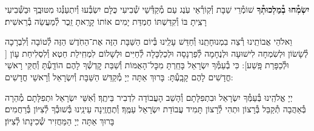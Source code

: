 \documentclass[twoside, openany, parskip=half, 11pt]{book}
\begin{document}
\begin{sometimes}
\textbf{יִשְׂמְ֯חוּ בְ֯מַלְכוּתְ֯ךָ}
שׁוֹמְ֯רֵי שַׁבָּת וְ֯קֽוֹרְ֯אֵי עֹֽנֶג עַם מְ֯קַדְּ֯שֵׁי שְׁ֯בִיעִי כֻּלָּם יִשְׂבְּ֯עוּ וְ֯יִתְעַנְּ֯גוּ מִטּוּבֶֽךָ וּבַשְּׁ֯בִיעִי רָצִֽיתָ בּוֹ וְ֯קִדַּשְׁתּוֹ חֶמְדַּת יָמִים אוֹתוֹ קָרָֽאתָ זֵֽכֶר לְ֯מַעֲשֵׂה בְ֯רֵאשִׁית׃

 וֵאלֹהֵי אֲבוֹתֵֽינוּ רְ֯צֵה בִמְנוּחָתֵֽנוּ וְ֯חַדֵּשׁ עָלֵֽינוּ בְּ֯יוֹם הַשַּׁבָּת הַזֶּה אֶת־הַחֹֽדֶשׁ הַזֶּה לְ֯טוֹבָה וְ֯לִבְרָכָה לְ֯שָׂשׂוֹן וּלְשִׂמְחָה לִישׁוּעָה וּלְנֶחָמָה לְ֯פַרְנָסָה וּלְכַלְכָּלָה לְ֯חַיִּים וּלְשָׁלוֹם לִמְחִֽילַת חֵטְא וְ֯לִסְלִיחַת עָוֹן [
וּלְ֯כַפָּרַת פָּֽשַׁע]: כִּי בְ֯עַמְּ֯ךָ יִשְׂרָאֵל בָּחַֽרְתָּ מִכׇּל־הָאֻמּוֹת וְ֯שַׁבַּת קׇדְשְׁ֯ךָ לָהֶם הוֹדָֽעְ֯תָּ וְ֯חֻקֵּי רָאשֵׁי חֳדָשִׁים לָהֶם קָבָֽעְ֯תָּ: בָּרוּךְ אַתָּה יְיָ מְ֯קַדֵּשׁ הַשַּׁבָּת וְ֯יִשְׂרָאֵל וְ֯רָאשֵׁי חֳדָשִׁים: 

\end{sometimes}

יְיָ אֱלֹהֵֽינוּ בְּ֯עַמְּ֯ךָ יִשְׂרָאֵל וּבִתְפִלָּתָם וְ֯הָשֵׁב הָעֲבוֹדָה לִדְבִיר בֵּיתֶֽךָ׃ וְ֯אִשֵּׁי יִשְׂרָאֵל וּתְפִלָּתָם מְ֯הֵרָה בְּ֯אַהֲבָה תְ֯קַבֵּל בְּ֯רָצוֹן וּתְהִי לְ֯רָצוֹן תָּמִיד עֲבוֹדַת יִשְׂרָאֵל עַמֶּֽךָ׃ וְ֯תֶחֱזֶֽינָה עֵינֵֽינוּ בְּ֯שׁוּבְ֯ךָ לְ֯צִיּוֹן בְּ֯רַחֲמִים׃
בָּרוּךְ אַתָּה יְיָ הַמַּחֲזִיר שְׁ֯כִינָתוֹ לְ֯צִיּוֹן׃

\modim

\shabboschanukah

\shabboshodos

\vspace{.5\baselineskip}

\shatzbrikaskohanim

\shabbossimshalom


\tachanunim

\fullkaddish
\end{document}
